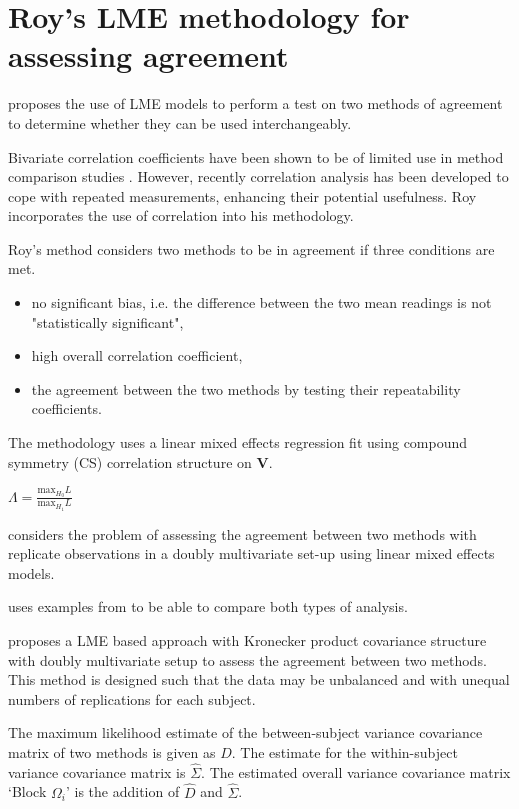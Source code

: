 \documentclass[12pt, a4paper]{report}
\theoremstyle{plain}
\theoremstyle{definition}
\theoremstyle{remark}
\begin{document}
\section{Roy's LME methodology for assessing agreement}

\citet{ARoy2009} proposes the use of LME models to perform a test
on two methods of agreement to determine whether they can be used
interchangeably.

Bivariate correlation coefficients have been shown to be of
limited use in method comparison studies \citep{BA86}. However,
recently correlation analysis has been developed to cope with
repeated measurements, enhancing their potential usefulness. Roy
incorporates the use of correlation into his methodology.

Roy's method considers two methods to be in agreement if three
conditions are met.

\begin{itemize}
	\item no significant bias, i.e. the difference between the two
	mean readings is not "statistically significant",
	
	\item high overall correlation coefficient,
	
	\item the agreement between the two methods by testing their
	repeatability coefficients.
	
\end{itemize}

The methodology uses a linear mixed effects regression fit using
compound symmetry (CS) correlation structure on \textbf{V}.


$\Lambda = \frac{\mbox{max}_{H_{0}}L}{\mbox{max}_{H_{1}}L}$



\citet{ARoy2009} considers the problem of assessing the agreement
between two methods with replicate observations in a doubly
multivariate set-up using linear mixed effects models.

\citet{ARoy2009} uses examples from \citet{BA86} to be able to
compare both types of analysis.

\citet{ARoy2009} proposes a LME based approach with Kronecker
product covariance structure with doubly multivariate setup to
assess the agreement between two methods. This method is designed
such that the data may be unbalanced and with unequal numbers of
replications for each subject.

The maximum likelihood estimate of the between-subject variance
covariance matrix of two methods is given as $D$. The estimate for
the within-subject variance covariance matrix is $\hat{\Sigma}$.
The estimated overall variance covariance matrix `Block
$\Omega_{i}$' is the addition of $\hat{D}$ and $\hat{\Sigma}$.
\end{document}
